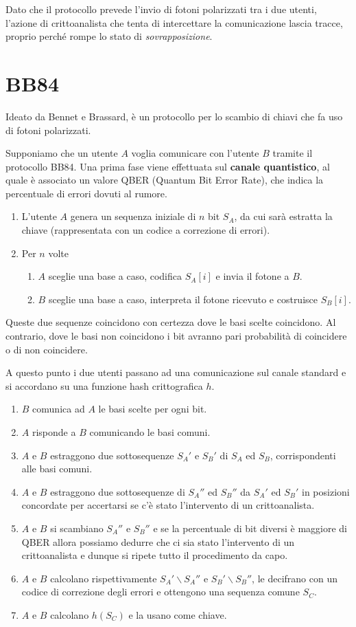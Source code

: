 Dato che il protocollo prevede l'invio di fotoni polarizzati tra i due utenti, l'azione di crittoanalista che tenta di
intercettare la comunicazione lascia tracce, proprio perch\'e rompe lo stato di \emph{sovrapposizione}.

\section{BB84}
Ideato da Bennet e Brassard, \`e un protocollo per lo scambio di chiavi che fa uso di fotoni polarizzati.

Supponiamo che un utente $A$ voglia comunicare con l'utente $B$ tramite il protocollo BB84. Una prima fase viene
effettuata sul \textbf{canale quantistico}, al quale \`e associato un valore QBER (Quantum Bit Error Rate), che indica
la percentuale di errori dovuti al rumore.
\begin{enumerate}
	\item L'utente $A$ genera un sequenza iniziale di $n$ bit $S_A$, da cui sar\`a estratta la chiave (rappresentata
	      con un codice a correzione di errori).
	\item Per $n$ volte
	      \begin{enumerate}[label=(\Roman*)]
		      \item $A$ sceglie una base a caso, codifica $S_A[i]$ e invia il fotone a $B$.
		      \item $B$ sceglie una base a caso, interpreta il fotone ricevuto e costruisce $S_B[i]$.
	      \end{enumerate}
\end{enumerate}
Queste due sequenze coincidono con certezza dove le basi scelte coincidono. Al contrario, dove le basi non coincidono
i bit avranno pari probabilit\`a di coincidere o di non coincidere.

A questo punto i due utenti passano ad una comunicazione sul canale standard e si accordano su una funzione hash
crittografica $h$.
\begin{enumerate}
	\item $B$ comunica ad $A$ le basi scelte per ogni bit.
	\item $A$ risponde a $B$ comunicando le basi comuni.
	\item $A$ e $B$ estraggono due sottosequenze $S_A'$ e $S_B'$ di $S_A$ ed $S_B$, corrispondenti alle basi comuni.
	\item $A$ e $B$ estraggono due sottosequenze di $S_A''$ ed $S_B''$ da $S_A'$ ed $S_B'$ in posizioni concordate per
	      accertarsi se c'\`e stato l'intervento di un crittoanalista.
	\item $A$ e $B$ si scambiano $S_A''$ e $S_B''$ e se la percentuale di bit diversi \`e maggiore di QBER allora
	      possiamo dedurre che ci sia stato l'intervento di un crittoanalista e dunque si ripete tutto il procedimento
	      da capo.
	\item $A$ e $B$ calcolano rispettivamente $S_A' \backslash S_A''$ e $S_B' \backslash S_B''$, le decifrano con un
	      codice di correzione degli errori e ottengono una sequenza comune $S_C$.
	\item $A$ e $B$ calcolano $h(S_C)$ e la usano come chiave.
\end{enumerate}


